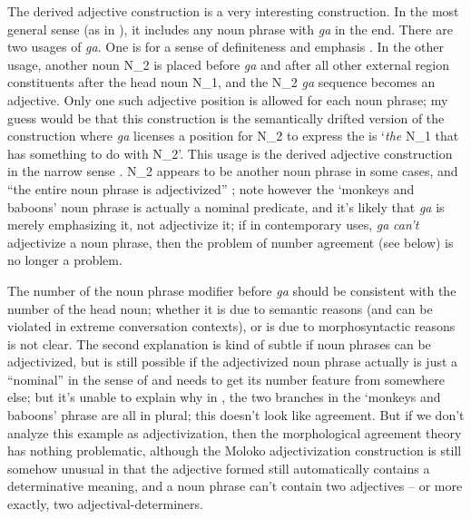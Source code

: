 \documentclass[a4paper, oneside, 12pt]{report}
\newcommand*{\citesec}[1]{\S~{#1}}
\newcommand*{\citefig}[1]{Fig.~{#1}}
\newcommand*{\citepage}[1]{p.~{#1}}
\newcommand*{\citepages}[1]{pp.~{#1}}
\newcommand{\form}[1]{\emph{#1}}
\newcommand{\translate}[1]{`#1'}
\begin{document}
The derived adjective construction is a very interesting construction.
In the most general sense (as in \citet[\citefig{5.1}]{friesen2017grammar}),
it includes any noun phrase with \form{ga} in the end.
There are two usages of \form{ga}.
One is for a sense of definiteness and emphasis \citep[\citesec{5.3.2}]{friesen2017grammar}.
In the other usage, 
another noun N_2 is placed before \form{ga} 
and after all other external region constituents
after the head noun N_1, 
and the N_2 \form{ga} sequence becomes an adjective. 
Only one such adjective position is allowed for each noun phrase; 
my guess would be that this construction is the semantically drifted version of 
the construction where \form{ga} 
licenses a position for N_2 to express
the is \translate{\emph{the} N_1 that has something to do with N_2}.
This usage is the derived adjective construction in the narrow sense 
\citep[\citepages{149-152}]{friesen2017grammar}.
N_2 appears to be another noun phrase in some cases, 
and ``the entire noun phrase is adjectivized''
\citep[\citepage{151, (45)}]{friesen2017grammar}; 
note however the \translate{monkeys and baboons} 
noun phrase is actually a nominal predicate, 
and it's likely that \form{ga} is merely emphasizing it, 
not adjectivize it; 
if in contemporary uses, \form{ga} \emph{can't} adjectivize 
a noun phrase, then the problem of number agreement (see below) 
is no longer a problem.

The number of the noun phrase modifier before \form{ga} 
should be consistent with the number of the head noun; 
whether it is due to semantic reasons  
(and can be violated in extreme conversation contexts),
or is due to morphosyntactic reasons is not clear.
The second explanation is 
kind of subtle if noun phrases can be adjectivized, 
but is still possible if the adjectivized noun phrase 
actually is just a ``nominal'' in the sense of \citet{cgel}
and needs to get its number feature from somewhere else; 
but it's unable to explain why in \citet[\citepage{151, (45)}]{friesen2017grammar},
the two branches in the \translate{monkeys and baboons} phrase are all in plural; 
this doesn't look like agreement.
But if we don't analyze this example as adjectivization, 
then the morphological agreement theory has nothing problematic, 
although the Moloko adjectivization construction is still somehow unusual 
in that the adjective formed still automatically contains a determinative meaning, 
and a noun phrase can't contain two adjectives -- 
or more exactly, two adjectival-determiners.



\end{document}
